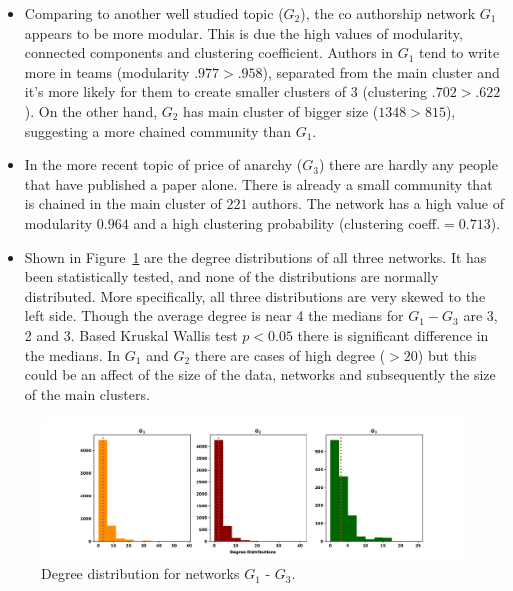 \documentclass{article}
\theoremstyle{definition}
\begin{document}
\begin{itemize}
    \item Comparing to another well studied topic (\(G_2\)), the co authorship
    network \(G_1\) appears to be more modular. This is due the high values of
    modularity, connected components and clustering coefficient. Authors in \(G_1\)
    tend to write more in teams (modularity $.977 > .958$), separated from the
    main cluster and it's more likely for them to create smaller clusters of 3
    (clustering $.702 > .622$). On the other hand, \(G_2\) has main cluster
    of bigger size ($1348 > 815$), suggesting a more chained community than \(G_1\).
    \item In the more recent topic of price of anarchy (\(G_3\)) there are hardly
    any people that have published a paper alone. There is already a small community
    that is chained in the main cluster of $221$ authors. The network has a high value
    of modularity $0.964$ and  a high clustering probability (clustering
    coeff.$=0.713$).
    \item Shown in Figure~\ref{fig:degree_distrs} are the degree distributions of
    all three networks. It has been statistically tested, and none of the distributions
    are normally distributed. More specifically, all three distributions are
    very skewed to the left side. Though the average degree is near 4 the medians
    for \(G_1 - G_3\) are 3, 2 and 3. Based Kruskal Wallis test \(p< 0.05\) there
    is significant difference in the medians. In \(G_1\) and \(G_2\) there are cases
    of high degree (\(> 20\)) but this could be an affect of the size of the data,
    networks and subsequently the size of the main clusters.
\end{itemize}


\begin{figure}[!hbtp]
    \centering
    \includegraphics[width=\textwidth]{./assets/images/networks_ditributions.pdf}
    \caption{Degree distribution for networks \(G_1\) - \(G_3\).}\label{fig:degree_distrs}
\end{figure}
\end{document}
